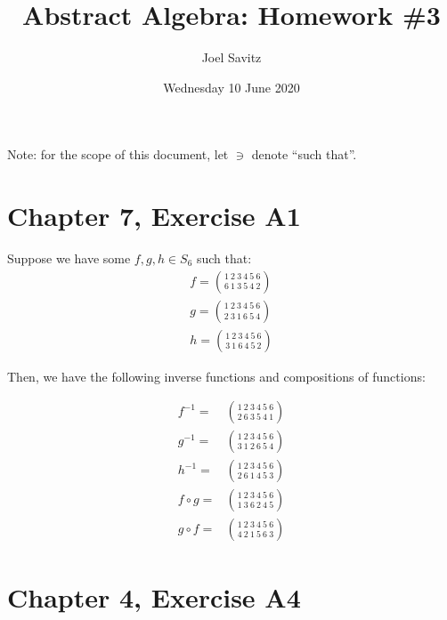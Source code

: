 \documentclass[12pt]{article}
\title{Abstract Algebra: Homework \#3}
\date{Wednesday 10 June 2020}
\author{Joel Savitz}
\begin{document}
\maketitle

Note: for the scope of this document, let $\ni$ denote ``such that''.

\section{Chapter 7, Exercise A1}

Suppose we have some $f,g,h \in S_6$ such that:
\begin{align}
	f = \binom{1\ 2\ 3\ 4\ 5\ 6}{6\ 1\ 3\ 5\ 4\ 2} \\
	g = \binom{1\ 2\ 3\ 4\ 5\ 6}{2\ 3\ 1\ 6\ 5\ 4} \\
	h = \binom{1\ 2\ 3\ 4\ 5\ 6}{3\ 1\ 6\ 4\ 5\ 2}
\end{align}

Then, we have the following inverse functions and compositions of functions:

\begin{align}
	f^{-1} = & \binom{1\ 2\ 3\ 4\ 5\ 6}{2\ 6\ 3\ 5\ 4\ 1} \\
	g^{-1} = & \binom{1\ 2\ 3\ 4\ 5\ 6}{3\ 1\ 2\ 6\ 5\ 4} \\
	h^{-1} = & \binom{1\ 2\ 3\ 4\ 5\ 6}{2\ 6\ 1\ 4\ 5\ 3} \\
	f \circ g = & \binom{1\ 2\ 3\ 4\ 5\ 6}{1\ 3\ 6\ 2\ 4\ 5} \\
	g \circ f = & \binom{1\ 2\ 3\ 4\ 5\ 6}{4\ 2\ 1\ 5\ 6\ 3}
\end{align}

\section{Chapter 4, Exercise A4}

\pagebreak
\end{document}
